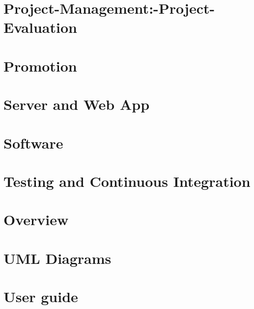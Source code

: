 \documentclass[twoside]{book}
\newcommand{\+}{\discretionary{\mbox{\scriptsize$\hookleftarrow$}}{}{}}
\begin{document}
\chapter{Project-\/\+Management\+:-\/\+Project-\/\+Evaluation}
\label{md_doc_wiki__project-_management_1-_project-_evaluation}

\chapter{Promotion}
\label{md_doc_wiki__promotion}

\chapter{Server and Web App}
\label{md_doc_wiki__server-and-_web-_app}

\chapter{Software}
\label{md_doc_wiki__software}

\chapter{Testing and Continuous Integration}
\label{md_doc_wiki__testing-and-_continuous-_integration}

\chapter{Overview}
\label{md_doc_wiki_u_blox-and-_cell_locate}

\chapter{U\+ML Diagrams}
\label{md_doc_wiki__u_m_l-_diagrams}

\chapter{User guide}
\label{md_doc_wiki__user-_guide}

\end{document}
